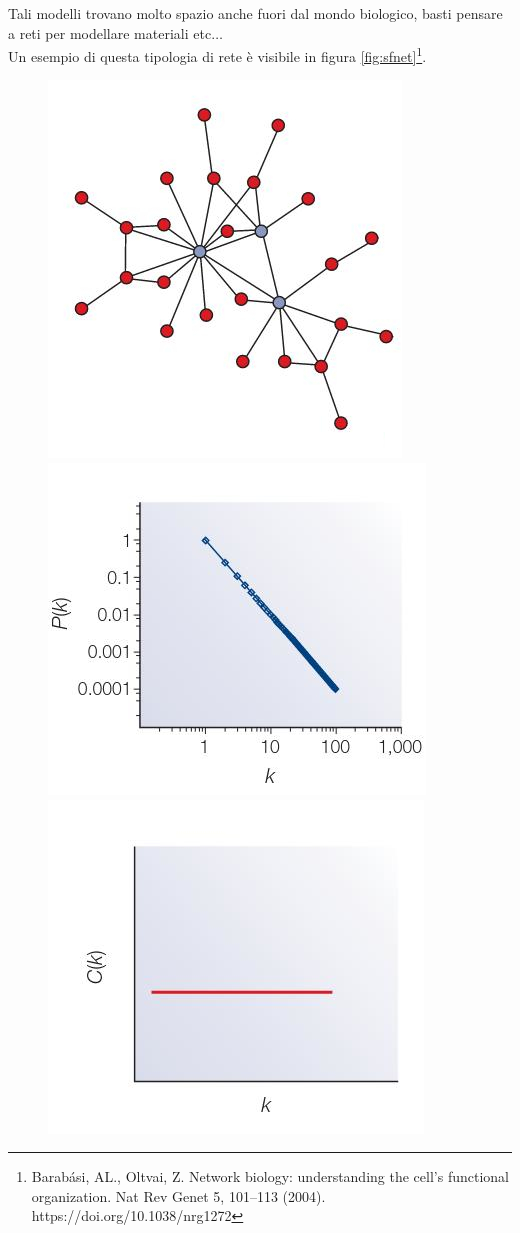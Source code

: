 \documentclass[a4paper,12pt, oneside]{book}
\begin{document}
Tali modelli trovano molto spazio anche fuori dal mondo biologico, basti
pensare a reti per modellare materiali etc$\ldots$\\
Un esempio di questa tipologia di rete è visibile in figura
\ref{fig:sfnet}\footnote{Barabási, AL., Oltvai, Z. Network biology: understanding
  the cell's functional organization. Nat Rev Genet 5, 101–113
  (2004). https://doi.org/10.1038/nrg1272}.
\begin{figure}
  \centering
  \includegraphics[scale = 2.25]{img/sfnet1.jpg}\\
  \includegraphics[scale = 1.75]{img/sfnet2.jpg}
  \includegraphics[scale = 1.75]{img/sfnet3.jpg}

\end{figure}
\end{document}
